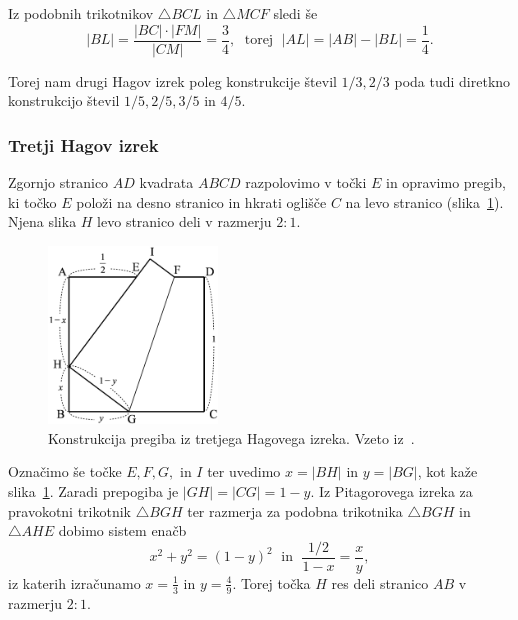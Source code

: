 Iz podobnih trikotnikov $\triangle BCL$ in $\triangle MCF$ sledi še
$$ |BL| = \frac{|BC| \cdot |FM|}{|CM|} = \frac{3}{4}, \; \text{ torej } \; |AL| = |AB| - |BL| = \frac{1}{4}. $$

Torej nam drugi Hagov izrek poleg konstrukcije števil $1/3, 2/3$ poda tudi diretkno konstrukcijo števil $1/5, 2/5, 3/5$ in $4/5$.

\subsubsection{Tretji Hagov izrek}

\begin{izrek}
    Zgornjo stranico $AD$ kvadrata $ABCD$ razpolovimo v točki $E$ in opravimo pregib, ki točko $E$ položi na desno stranico in hkrati oglišče $C$ na levo stranico (slika~\ref{fig:hagov_izrek3}). Njena slika $H$ levo stranico deli v razmerju $2:1$.
\end{izrek}

\begin{figure}[h]
    \centering
    \includegraphics[width=0.4\textwidth]{images/hagovi_izreki/hagov_izrek3.png}
    \caption[Pregib iz tretjega Hagovega izreka]{Konstrukcija pregiba iz tretjega Hagovega izreka. Vzeto iz~\cite[str. 18]{haga2008}.}
    \label{fig:hagov_izrek3}
\end{figure}

\begin{dokaz}
    Označimo še točke $E, F, G,$ in $I$ ter uvedimo $x = |BH|$ in $y = |BG|$, kot kaže slika~\ref{fig:hagov_izrek3}. Zaradi prepogiba je $|GH| = |CG| = 1-y$. Iz Pitagorovega izreka za pravokotni trikotnik $\triangle BGH$ ter razmerja za podobna trikotnika $\triangle BGH$ in $\triangle AHE$ dobimo sistem enačb
    $$ x^2 + y^2 = (1-y)^2 \; \text{ in } \; \frac{1/2}{1-x} = \frac{x}{y}, $$
    iz katerih izračunamo $x = \frac{1}{3}$ in $y = \frac{4}{9}$. Torej točka $H$ res deli stranico $AB$ v razmerju $2:1$.
\end{dokaz}

